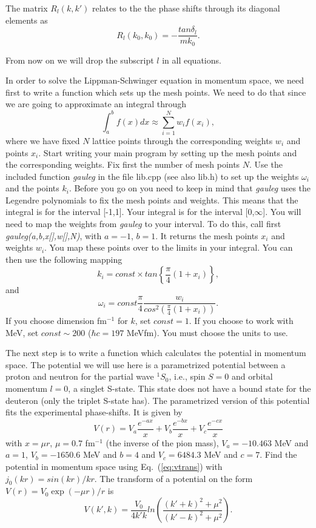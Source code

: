 \documentclass[prc]{revtex4}
\begin{document}
The matrix $R_l(k,k')$ relates to the 
the  phase shifts through its diagonal elements as
\begin{equation}
     R_l(k_0,k_0)=-\frac{tan\delta_l}{mk_0}.
     \label{eq:shifts}
\end{equation}

From now on we will drop the subscript $l$ in all equations.

In order to solve the Lippman-Schwinger equation 
in momentum space, we need first to write 
a function which sets up the mesh points. 
We need to do that since we are going to approximate an integral
through 
\[
   \int_a^bf(x)dx\approx\sum_{i=1}^Nw_if(x_i),
\]
where we have fixed $N$ lattice points through the corresponding weights
$w_i$ and points $x_i$. 
Start writing your main program by setting up the mesh points
and the corresponding weights.
Fix first the number of mesh points $N$.
Use the included function {\em gauleg} in the file lib.cpp (see also lib.h) to set up the 
weights $\omega_i$ and the points $k_i$. Before you go on 
you need to keep in mind that {\em gauleg} uses 
the Legendre polynomials to fix
the mesh points and weights. This means that the integral is for the 
interval [-1,1]. Your integral is for the interval [0,$\infty$]. 
You will need to map the weights  from {\em gauleg} to your interval.
To do this, call first {\em gauleg(a,b,x[],w[],N)}, 
with $a=-1$, $b=1$.
It returns the mesh points $x_i$ and weights $w_i$. 
You map these points over to the limits in your integral. You can then
use the following mapping
        \[
          k_i=const\times tan\left\{\frac{\pi}{4}(1+x_i)\right\},
        \]
and 
         \[
            \omega_i= const\frac{\pi}{4}\frac{w_i}{cos^2\left(\frac{\pi}{4}(1+x_i)\right)}.
         \]
If you choose dimension fm$^{-1}$ for $k$, set $const=1$. If you choose to work
with MeV, set $const\sim 200$ ($\hbar c=197$ MeVfm).
You must choose the units to use.

The next step is to write a function which calculates the potential
in momentum space. The potential we will use here is a parametrized  potential
between a proton and neutron for the partial wave  $^1S_0$, 
i.e., spin $S=0$ and
orbital momentum $l=0$, a singlet S-state. 
This state does not have a bound state
for the deuteron (only the triplet S-state has). 
The parametrized version of this potential fits the experimental
phase-shifts. It is given by
\begin{equation}
  V(r)=V_a \frac{e^{-ax}}{x}+V_b \frac{e^{-bx}}{x}+V_c \frac{e^{-cx}}{x}
  \label{eq:realp}
\end{equation}
with $x=\mu r$, $\mu=0.7$ fm$^{-1}$ (the inverse of the pion mass),
$V_a=-10.463$ MeV and $a=1$, $V_b=-1650.6$ MeV and $b=4$ and
$V_c=6484.3$ MeV and $c=7$. 
Find the potential in momentum space using Eq.\ (\ref{eq:vtrans})
with $j_0(kr)=sin(kr)/kr$. 
The transform of a potential on the form 
$V(r)=V_0\exp{(-\mu r)}/r$ is
\begin{equation}
     V(k',k)= \frac{V_0}{4k'k}ln\left(\frac{(k'+k)^2+\mu^2}{(k'-k)^2+\mu^2}\right).
\end{equation}
\end{document}
